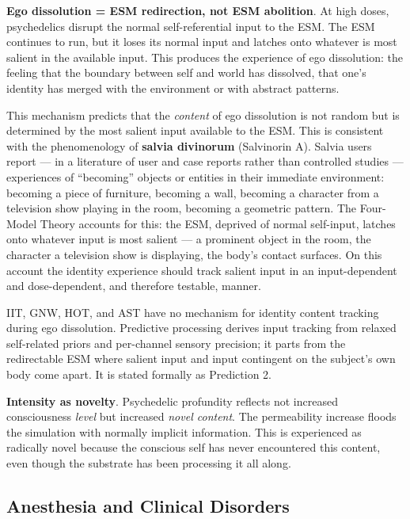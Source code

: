 \documentclass[12pt]{article}
\begin{document}
\textbf{Ego dissolution = ESM redirection, not ESM abolition}. At high doses, psychedelics disrupt the normal self-referential input to the ESM. The ESM continues to run, but it loses its normal input and latches onto whatever is most salient in the available input. This produces the experience of ego dissolution: the feeling that the boundary between self and world has dissolved, that one's identity has merged with the environment or with abstract patterns.

This mechanism predicts that the \emph{content} of ego dissolution is not random but is determined by the most salient input available to the ESM. This is consistent with the phenomenology of \textbf{salvia divinorum} (Salvinorin A). Salvia users report --- in a literature of user and case reports rather than controlled studies --- experiences of ``becoming'' objects or entities in their immediate environment: becoming a piece of furniture, becoming a wall, becoming a character from a television show playing in the room, becoming a geometric pattern. The Four-Model Theory accounts for this: the ESM, deprived of normal self-input, latches onto whatever input is most salient --- a prominent object in the room, the character a television show is displaying, the body's contact surfaces. On this account the identity experience should track salient input in an input-dependent and dose-dependent, and therefore testable, manner.

IIT, GNW, HOT, and AST have no mechanism for identity content tracking during ego dissolution. Predictive processing derives input tracking from relaxed self-related priors and per-channel sensory precision; it parts from the redirectable ESM where salient input and input contingent on the subject's own body come apart. It is stated formally as Prediction 2.

\textbf{Intensity as novelty}. Psychedelic profundity reflects not increased consciousness \emph{level} but increased \emph{novel content}. The permeability increase floods the simulation with normally implicit information. This is experienced as radically novel because the conscious self has never encountered this content, even though the substrate has been processing it all along.


\subsection{Anesthesia and Clinical Disorders}
\end{document}
